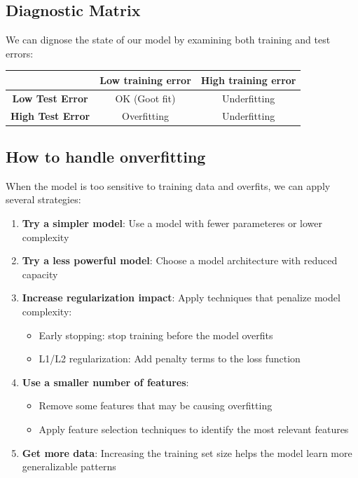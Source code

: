 \documentclass[a4paper]{article}
\theoremstyle{definition}
\begin{document}
\subsection{Diagnostic Matrix}
We can dignose the state of our model by examining both training and test errors:
\begin{center}
    \begin{tabular}{ |c|c|c| }
        \hline
        & \textbf{Low training error} & \textbf{High training error} \\
        \hline 
        \textbf{Low Test Error} & OK (Goot fit) & Underfitting \\
        \hline 
        \textbf{High Test Error} & Overfitting & Underfitting \\
        \hline
    \end{tabular}
\end{center}
\subsection{How to handle onverfitting}
When the model is too sensitive to training data and overfits, we can apply several strategies:
\begin{enumerate}
    \item \textbf{Try a simpler model}: Use a model with fewer parameteres or lower complexity 
    \item \textbf{Try a less powerful model}: Choose a model architecture with reduced capacity 
    \item \textbf{Increase regularization impact}: Apply techniques that penalize model complexity:
    \begin{itemize}
        \item Early stopping: stop training before the model overfits 
        \item L1/L2 regularization: Add penalty terms to the loss function 
    \end{itemize}
    \item \textbf{Use a smaller number of features}:
    \begin{itemize}
        \item Remove some features that may be causing overfitting 
        \item Apply feature selection techniques to identify the most relevant features 
    \end{itemize}
    \item \textbf{Get more data}: Increasing the training set size helps the model learn more generalizable patterns
\end{enumerate}
\end{document}

